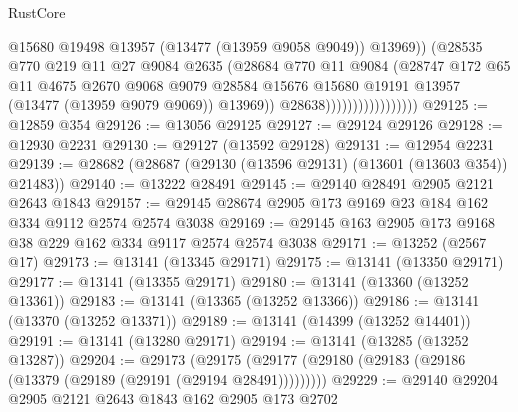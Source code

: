 \begin{lexlean}{RustCore}
\begin{coremodule}
                                        @15680
                                        @19498
                                        @13957
                                        (@13477 (@13959 @9058 @9049))
                                        @13969))
                                    (@28535
                                      @770
                                      @219
                                      @11
                                      @27
                                      @9084
                                      @2635
                                      (@28684
                                        @770
                                        @11
                                        @9084
                                        (@28747
                                          @172
                                          @65
                                          @11
                                          @4675
                                          @2670
                                          @9068
                                          @9079
                                          @28584
                                          @15676
                                          @15680
                                          @19191
                                          @13957
                                          (@13477 (@13959 @9079 @9069))
                                          @13969))
                                      @28638)))))))))))))))))
@29125 := @12859 @354
@29126 := @13056 @29125
@29127 := @29124 @29126
@29128 := @12930 @2231
@29130 := @29127 (@13592 @29128)
@29131 := @12954 @2231
@29139 := @28682 (@28687 (@29130 (@13596 @29131) (@13601 (@13603 @354)) @21483))
@29140 := @13222 @28491
@29145 := @29140 @28491 @2905 @2121 @2643 @1843
@29157 := @29145 @28674 @2905 @173 @9169 @23 @184 @162 @334 @9112 @2574 @2574 @3038
@29169 := @29145 @163 @2905 @173 @9168 @38 @229 @162 @334 @9117 @2574 @2574 @3038
@29171 := @13252 (@2567 @17)
@29173 := @13141 (@13345 @29171)
@29175 := @13141 (@13350 @29171)
@29177 := @13141 (@13355 @29171)
@29180 := @13141 (@13360 (@13252 @13361))
@29183 := @13141 (@13365 (@13252 @13366))
@29186 := @13141 (@13370 (@13252 @13371))
@29189 := @13141 (@14399 (@13252 @14401))
@29191 := @13141 (@13280 @29171)
@29194 := @13141 (@13285 (@13252 @13287))
@29204 := @29173
    (@29175 (@29177 (@29180 (@29183 (@29186 (@13379 (@29189 (@29191 (@29194 @28491)))))))))
@29229 := @29140
    @29204
    @2905
    @2121
    @2643
    @1843
    @162
    @2905
    @173
    @2702

\end{coremodule}
\end{lexlean}
